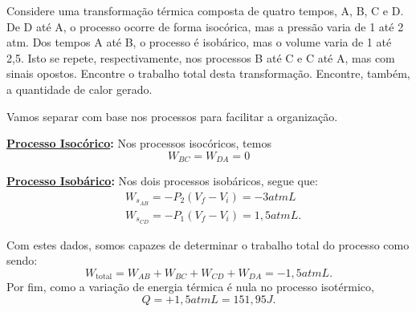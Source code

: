 \documentclass[phsyicsII_notes.tex]{subfiles}
\begin{document}
\begin{example}
	Considere uma transformação térmica composta de quatro tempos, A, B, C e D. De D até A, o processo ocorre
	de forma isocórica, mas a pressão varia de 1 até 2 atm. Dos tempos A até B, o processo é isobárico, mas o volume varia
	de 1 até 2,5. Isto se repete, respectivamente, nos processos B até C e C até A, mas com sinais opostos. Encontre o trabalho total
	desta transformação. Encontre, também, a quantidade de calor gerado.

	Vamos separar com base nos processos para facilitar a organização.

	\textbf{\underline{Processo Isocórico}:}
	Nos processos isocóricos, temos
	\[
		W_{BC} = W_{DA} = 0
	\]

	\textbf{\underline{Processo Isobárico}:}
	Nos dois processos isobáricos, segue que:
	\begin{align*}
		 & W_{s_{AB}} = -P_{2}(V_{f}-V_{i}) = -3atmL   \\
		 & W_{s_{CD}} = -P_{1}(V_{f}-V_{i}) = 1,5atmL.
	\end{align*}

	Com estes dados, somos capazes de determinar o trabalho total do processo como sendo:
	\[
		W_{\text{total}} = W_{AB} + W_{BC} + W_{CD} + W_{DA} = -1,5atmL.
	\]
	Por fim, como a variação de energia térmica é nula no processo isotérmico,
	\[
		Q = +1,5atmL = 151,95J.
	\]
\end{example}
\end{document}
